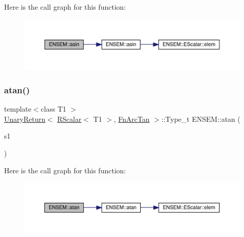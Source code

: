 Here is the call graph for this function\+:\nopagebreak
\begin{figure}[H]
\begin{center}
\leavevmode
\includegraphics[width=350pt]{d9/ded/group__rscalar_ga74e5212c5ef434f0f0f94bf61b79f0fb_cgraph}
\end{center}
\end{figure}
\mbox{\label{group__rscalar_ga540f6e66ddf6d73bc001906c1578e737}} 
\subsubsection{\texorpdfstring{atan()}{atan()}}
{\footnotesize\ttfamily template$<$class T1 $>$ \\
\mbox{\hyperlink{structENSEM_1_1UnaryReturn}{Unary\+Return}}$<$ \mbox{\hyperlink{classENSEM_1_1RScalar}{R\+Scalar}}$<$ T1 $>$, \mbox{\hyperlink{structENSEM_1_1FnArcTan}{Fn\+Arc\+Tan}} $>$\+::Type\+\_\+t E\+N\+S\+E\+M\+::atan (\begin{DoxyParamCaption}\item[{const \mbox{\hyperlink{classENSEM_1_1RScalar}{R\+Scalar}}$<$ T1 $>$ \&}]{s1 }\end{DoxyParamCaption})\hspace{0.3cm}{\ttfamily [inline]}}

Here is the call graph for this function\+:\nopagebreak
\begin{figure}[H]
\begin{center}
\leavevmode
\includegraphics[width=350pt]{d9/ded/group__rscalar_ga540f6e66ddf6d73bc001906c1578e737_cgraph}
\end{center}
\end{figure}
\mbox{\label{group__rscalar_ga855c0e6f402b471f9ddfc04245e0b910}} 
